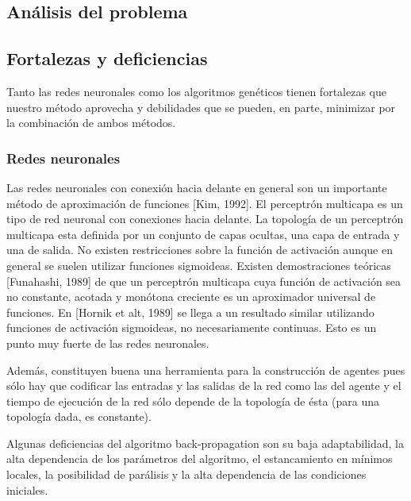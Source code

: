 \documentclass[11pt]{article}
\begin{document}
\begin{titlepage}
\newpage
\section{An\'alisis del problema}
\label{sec-3}

  \label{analisis}
\subsection{Fortalezas y deficiencias}
\label{sec-3-1}

  \label{anaFortYDeb}

 Tanto las redes neuronales como los algoritmos gen\'eticos tienen fortalezas que nuestro m\'etodo aprovecha y debilidades que se pueden, en parte, minimizar por la combinaci\'on de ambos m\'etodos.
\subsubsection{Redes neuronales}
\label{sec-3-1-1}

  \label{anaFortYDebRedes}

 Las redes neuronales con conexi\'on hacia delante en general son un importante m\'etodo de aproximaci\'on de funciones [Kim, 1992]. El perceptr\'on multicapa es un tipo de red neuronal con conexiones hacia delante. La topolog\'ia de un perceptr\'on multicapa esta definida por un conjunto de capas ocultas, una capa de entrada y una de salida. No existen restricciones sobre la funci\'on de activaci\'on aunque en general se suelen utilizar funciones sigmoideas. Existen demostraciones te\'oricas [Funahashi, 1989] de que un perceptr\'on multicapa cuya funci\'on de activaci\'on sea no constante, acotada y mon\'otona creciente es un aproximador universal de funciones. En [Hornik et alt, 1989] se llega a un resultado similar utilizando funciones de activaci\'on sigmoideas, no necesariamente continuas. Esto es un punto muy fuerte de las redes neuronales. 

 Adem\'as, constituyen buena una herramienta para la construcci\'on de agentes pues s\'olo hay que codificar las entradas y las salidas de la red como las del agente y el tiempo de ejecuci\'on de la red s\'olo depende de la topolog\'ia de \'esta (para una topolog\'ia dada, es constante).

 Algunas deficiencias del algoritmo back-propagation son su baja adaptabilidad, la alta dependencia de los par\'ametros del algoritmo, el estancamiento en m\'inimos locales, la posibilidad de par\'alisis y la alta dependencia de las condiciones iniciales.
\begin{listaDefiniciones}


\end{listaDefiniciones}
\end{titlepage}
\end{document}
